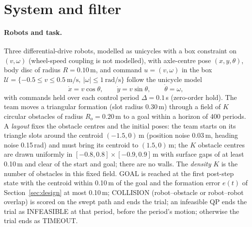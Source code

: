 \documentclass[journal]{IEEEtran}
\begin{document}
\section{System and filter}\label{sec:system}
\paragraph{Robots and task.} Three differential-drive robots, modelled as unicycles with a box
constraint on $(v,\omega)$ (wheel-speed coupling is not modelled), with axle-centre pose $(x,y,\theta)$,
body disc of radius $R=0.10$\,m, and command $u=(v,\omega)$ in the box
$\mathcal U=\{-0.5\le v\le 0.5\ \mathrm{m/s},\ |\omega|\le 1\ \mathrm{rad/s}\}$ follow the unicycle model
\begin{equation}
\dot x = v\cos\theta,\qquad \dot y = v\sin\theta,\qquad \dot\theta=\omega ,
\end{equation}
with commands held over each control period $\Delta=0.1$\,s (zero-order hold). The team moves a
triangular formation (slot radius 0.30\,m) through a field of $K$ circular obstacles of radius
$R_o=0.20$\,m to a goal within a horizon of 400 periods. A \emph{layout} fixes the obstacle centres and the
initial poses: the team starts on its triangle slots around the centroid $(-1.5,0)$\,m (position noise
0.03\,m, heading noise 0.15\,rad) and must bring its centroid to $(1.5,0)$\,m; the $K$ obstacle centres
are drawn uniformly in $[-0.8,0.8]\times[-0.9,0.9]$\,m with surface gaps of at least 0.10\,m and clear of
the start and goal; there are no walls. The \emph{density} $K$ is the number of obstacles in this fixed
field. GOAL is reached at the first post-step state with the centroid within 0.10\,m of the goal and the
formation error $e(t)$ of Section~\ref{sec:design} at most 0.10\,m; COLLISION (robot--obstacle or
robot--robot overlap) is scored on the swept path and ends the trial; an infeasible QP ends the trial as
INFEASIBLE at that period, before the period's motion; otherwise the trial ends as TIMEOUT.
\end{document}
